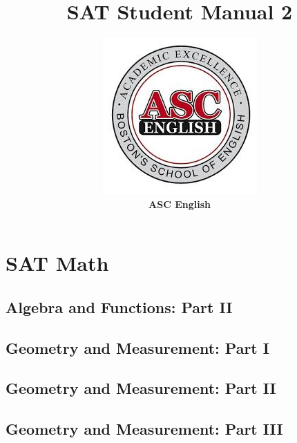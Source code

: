\documentclass[12pt]{book}
\title{\textbf{\sffamily\huge SAT Student Manual 2}}
\author{\includegraphics{logo}\\\textbf{\sffamily\large ASC English}}
\date{}
\begin{document}
\frontmatter
\maketitle


{\sffamily\tableofcontents}
\mainmatter



\part{SAT Math}



	
	
	
	
	
	
	


	
	
	
	
	

\chapter{Algebra and Functions: Part II}
	
	
	
	
	
	

\chapter{Geometry and Measurement: Part I}
	
	
	
	

\chapter{Geometry and Measurement: Part II}
	
	
	
	

\chapter{Geometry and Measurement: Part III}
	
	
\end{document}
